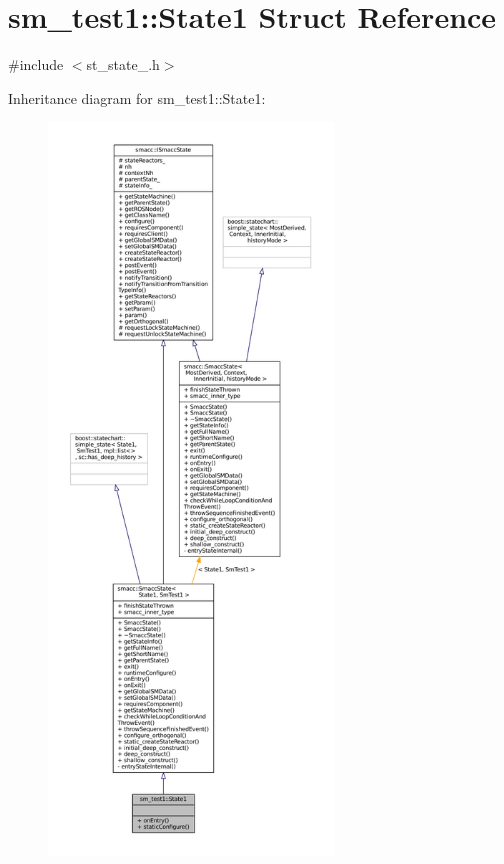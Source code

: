 \hypertarget{structsm__test1_1_1State1}{}\section{sm\+\_\+test1\+:\+:State1 Struct Reference}
\label{structsm__test1_1_1State1}


{\ttfamily \#include $<$st\+\_\+state\+\_.\+h$>$}



Inheritance diagram for sm\+\_\+test1\+:\+:State1\+:
\nopagebreak
\begin{figure}[H]
\begin{center}
\leavevmode
\includegraphics[height=550pt]{structsm__test1_1_1State1__inherit__graph}
\end{center}
\end{figure}


